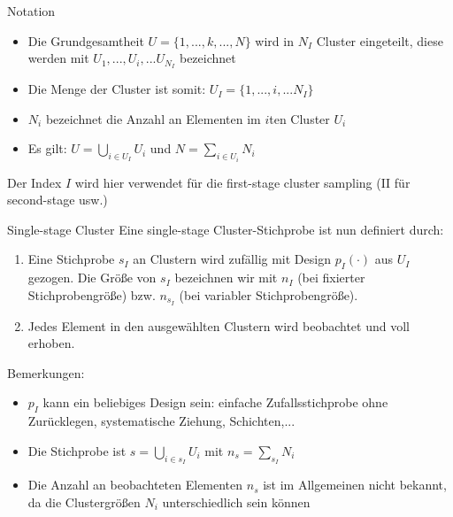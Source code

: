 \documentclass[9pt]{beamer}
\begin{document}
\begin{frame}{Notation}
\begin{itemize}
	\item Die Grundgesamtheit $U=\{1,...,k,...,N\}$ wird in $N_I$ Cluster eingeteilt, diese werden mit $U_1,...,U_i,... U_{N_I}$ bezeichnet
	\item Die Menge der Cluster ist somit: $U_I = \{1,...,i,... N_I\}$
	\item $N_i$ bezeichnet die Anzahl an Elementen im $i$ten Cluster $U_i$
	\item Es gilt: $U = \bigcup_{i \in U_{I}} U_i$ und $N = \sum_{i \in U_{i}} N_i$
\end{itemize}
Der Index $I$ wird hier verwendet für die first-stage cluster sampling (II für second-stage usw.)
\end{frame}

\begin{frame}{Single-stage Cluster}
Eine single-stage Cluster-Stichprobe ist nun definiert durch:
\begin{enumerate}
	\item Eine Stichprobe $s_I$ an Clustern wird zufällig mit Design $p_I(\cdot)$ aus $U_I$ gezogen. Die Größe von $s_I$ bezeichnen wir mit $n_I$ (bei fixierter Stichprobengröße) bzw. $n_{s_I}$ (bei variabler Stichprobengröße).
	\item Jedes Element in den ausgewählten Clustern wird beobachtet und voll erhoben.
\end{enumerate}
Bemerkungen:
\begin{itemize}
\item $p_I$ kann ein beliebiges Design sein: einfache Zufallsstichprobe ohne Zurücklegen, systematische Ziehung, Schichten,...
\item Die Stichprobe ist $s=\bigcup_{i \in s_{I}} U_i$ mit $n_s = \sum_{s_I} N_i$
\item Die Anzahl an beobachteten Elementen $n_s$ ist im Allgemeinen nicht bekannt, da die Clustergrößen $N_i$ unterschiedlich sein können
\end{itemize}
\end{frame}
\end{document}
